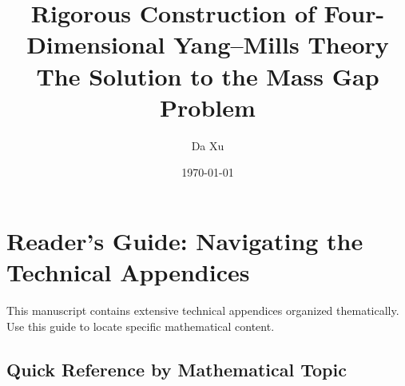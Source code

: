 \documentclass[11pt,a4paper]{report}
\title{\textbf{Rigorous Construction of Four-Dimensional Yang--Mills Theory}\\ \large The Solution to the Mass Gap Problem}
\author{Da Xu}
\date{\today}
\begin{document}
\maketitle





\tableofcontents

% 
% 


\newpage

\chapter*{Reader's Guide: Navigating the Technical Appendices}

This manuscript contains extensive technical appendices organized thematically. Use this guide to locate specific mathematical content.

\section*{Quick Reference by Mathematical Topic}
\end{document}
